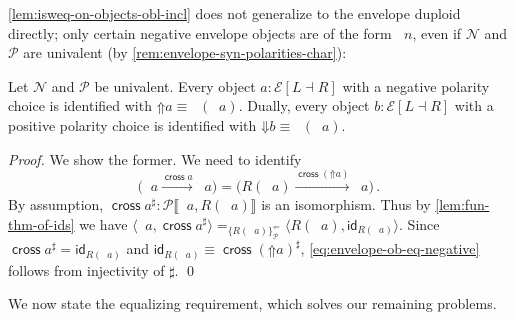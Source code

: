\documentclass[runningheads]{llncs}
\newcommand*\rocqlogo{\usebox{\rocqlogobox}}
\newcommand{\lemmaref}[3]{\href{https://github.com/UniMath/UniMath/blob/94fae0eda57a778cec704bfa73b4ff525c9bc475/#1\#L#2?name=#3}{\rocqlogo}}
\newcommand{\acat}[1]{\mathcal{#1}}
\newcommand{\PP}{\acat{P}}
\newcommand{\NN}{\acat{N}}
\newcommand{\EE}{\acat{E}}
\newcommand{\Env}[1]{\EE[#1]}
\newcommand{\id}{\mathsf{id}}
\newcommand{\morsof}[3]{{#1}\llbracket{#2},{#3}\rrbracket}
\newcommand{\ifan}[2]{\{#2\}^{{\Leftarrow}}_{#1}}
\newcommand{\upshift}{\mathord{\Uparrow}}
\newcommand{\downshift}{\mathord{\Downarrow}}
\newcommand{\inneg}{\mathop{\iota^{\ominus}}}
\newcommand{\inpos}{\mathop{\iota^{\oplus}}}
\newcommand{\projneg}{\mathop{\pi^{\ominus}}}
\newcommand{\projpos}{\mathop{\pi^{\oplus}}}
\newcommand{\crossmor}{\mathop{\mathsf{cross}}}
\newcommand{\innegE}{\mathop{\iota^{\ominus}_{\EE}}}
\begin{document}
\autoref{lem:isweq-on-objects-obl-incl} does not generalize to the envelope
duploid directly; only certain negative envelope objects are of the
form \(\innegE n\), even if \(\NN\) and \(\PP\) are univalent (by
\autoref{rem:envelope-syn-polarities-char}):

\begin{lemma}[{\lemmaref{UniMath/CategoryTheory/Nonassociative/Duploids/FromAdjunction/EqualizingRequirement.v}{756}{envelope\_chosen\_negative\_ob\_eq}}]
\label{lem:envelope-ob-eq-negative}
Let \(\NN\) and \(\PP\) be univalent. Every object \(a : \Env{L \dashv
 R}\) with a negative polarity choice is identified with
 \(\upshift{a} \equiv \inneg(\projneg{a})\). Dually, every object
 \(b : \Env{L \dashv R}\) with a positive polarity choice is
 identified with \(\downshift{b} \equiv \inpos(\projpos{a})\).
\end{lemma}
\begin{proof}
We show the former. We need to identify
\begin{equation}
\Big(\projpos a \xrightarrow{\crossmor a} \projneg a\Big)
= \Big(R(\projneg a) \xrightarrow{\crossmor(\upshift a)} \projneg a\Big)\mathpunct.
\label{eq:envelope-ob-eq-negative}
\end{equation}
By assumption, \(\crossmor a^\sharp : \morsof\PP{\projpos
a}{R(\projneg a)}\) is an isomorphism. Thus by \autoref{lem:fun-thm-of-ids} we
have \(\langle \projpos a, \crossmor a^\sharp \rangle
=_{\ifan\PP{R(\projneg a)}} \langle R(\projneg a), \id_{R(\projneg a)}
\rangle\).  Since \(\crossmor a^\sharp = \id_{R(\projneg a)}\) and
\(\id_{R(\projneg a)} \equiv \crossmor(\upshift a)^\sharp\),
\autoref{eq:envelope-ob-eq-negative} follows from injectivity of
\(\sharp\).
\qed
\end{proof}

We now state the equalizing requirement, which solves our remaining problems.
\end{document}
